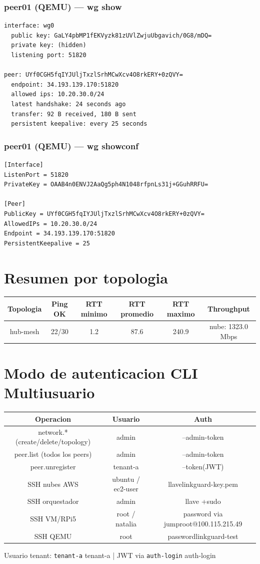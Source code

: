 \documentclass[11pt,a4paper]{article}
\begin{document}
\subsubsection*{peer01 (QEMU) — wg show}
\begin{lstlisting}
interface: wg0
  public key: GaLY4pbMP1fEKVyzk81zUVlZwjuUbgavich/0G8/mDQ=
  private key: (hidden)
  listening port: 51820

peer: UYf0CGH5fqIYJUljTxzlSrhMCwXcv4O8rkERY+0zQVY=
  endpoint: 34.193.139.170:51820
  allowed ips: 10.20.30.0/24
  latest handshake: 24 seconds ago
  transfer: 92 B received, 180 B sent
  persistent keepalive: every 25 seconds

\end{lstlisting}

\subsubsection*{peer01 (QEMU) — wg showconf}
\begin{lstlisting}
[Interface]
ListenPort = 51820
PrivateKey = OAAB4n0ENVJ2AaQg5ph4N1048rfpnLs31j+GGuhRRFU=

[Peer]
PublicKey = UYf0CGH5fqIYJUljTxzlSrhMCwXcv4O8rkERY+0zQVY=
AllowedIPs = 10.20.30.0/24
Endpoint = 34.193.139.170:51820
PersistentKeepalive = 25

\end{lstlisting}

\section{Resumen por topologia}
\begin{longtable}{|c|c|c|c|c|c|}
\hline
Topologia & Ping OK & RTT minimo & RTT promedio & RTT maximo & Throughput \\ \hline
hub-mesh & 22/30 & 1.2 & 87.6 & 240.9 & nube: 1323.0 Mbps \\ \hline
\end{longtable}

\section{Modo de autenticacion CLI Multiusuario}
\begin{longtable}{|c|c|c|}
\hline
Operacion & Usuario & Auth \\ \hline
network.* (create/delete/topology) & admin & --admin-token \\ \hline
peer.list (todos los peers) & admin & --admin-token \\ \hline
peer.unregister & tenant-a & --token(JWT) \\ \hline
SSH nubes AWS & ubuntu / ec2-user & llavelinkguard-key.pem \\ \hline
SSH orquestador & admin & llave +sudo \\ \hline
SSH VM/RPi5 & root / natalia & password via jumproot@100.115.215.49 \\ \hline
SSH QEMU & root & passwordlinkguard-test \\ \hline
\end{longtable}

Usuario tenant:  \texttt{tenant-a} tenant-a  | JWT via  \texttt{auth-login} auth-login\\
\end{document}
